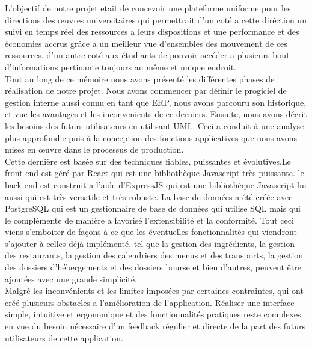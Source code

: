 \renewcommand{\thechapter}{}
\renewcommand{\chaptername}{}

L'objectif de notre projet etait de concevoir une plateforme uniforme pour les directions des œuvres universitaires qui permettrait d'un coté a cette diréction un suivi en temps réel des ressources a leurs dispositions et une performance et des économies accrus grâce a un meilleur vue d'ensembles des mouvement de ces ressources, d'un autre coté aux étudiants de pouvoir accéder a plusieurs bout d'informations pertinante toujours au même et unique endroit.\\

Tout au long de ce mémoire nous avons présenté les différentes phases de réalisation de notre projet. Nous avons commencer par définir le progiciel de gestion interne aussi connu en tant que \acs{ERP}, nous avons parcouru son historique, et vue les avantages et les inconvenients de ce derniers. Ensuite, nous avons décrit les besoins des futurs utilisateurs en utilisant UML. Ceci a conduit à une analyse plus approfondie puis à la conception des fonctions applicatives que nous avons mises en œuvre dans le processus de production.\\

Cette dernière est basée sur des techniques fiables, puissantes et évolutives.Le front-end est géré par React qui est une bibliothèque Javascript très puissante. le back-end est construit a l'aide d'ExpressJS qui est une bibliothèque Javascript lui aussi qui est très versatile et très robuste. La base de données a été créée avec PostgreSQL qui est un gestionnaire de base de données qui utilise \acs{SQL} mais qui le complémente de manière a favorisé l'extensibilité et la conformité. Tout ceci viens s'emboiter de façons à ce que les éventuelles fonctionnalités qui viendront s'ajouter à celles déjà implémenté, tel que la gestion des ingrédients, la gestion des restaurants, la gestion des calendriers des menus et des transports, la gestion des dossiers d'hébergements et des dossiers bourse et bien d'autres, peuvent être ajoutées avec une grande simplicité.\\

Malgré les inconvénients et les limites imposées par certaines contraintes, qui ont créé plusieurs obstacles a l'amélioration de l'application. Réaliser une interface simple, intuitive et ergonomique et des fonctionnalités pratiques reste complexes en vue du besoin nécessaire d'un feedback régulier et directe de la part des futurs utilisateurs de cette application.\\

